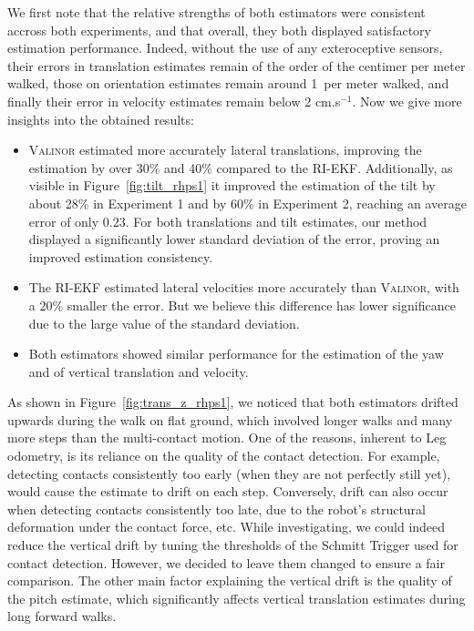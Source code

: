 \documentclass{IJCAS}
\begin{document}
We first note that the relative strengths of both estimators were consistent accross both experiments, and that overall, they both displayed satisfactory estimation performance. Indeed, without the use of any exteroceptive sensors, their errors in translation estimates remain of the order of the centimer per meter walked, those on orientation estimates remain around 1\textdegree \ per meter walked, and finally their error in velocity estimates remain below 2 cm.s$^{-1}$. Now we give more insights into the obtained results:
\begin{itemize}
    \item {\scshape Valinor} estimated more accurately lateral translations, improving the estimation by over 30\% and 40\% compared to the RI-EKF. Additionally, as visible in Figure~\ref{fig:tilt_rhps1} it improved the estimation of the tilt by about 28\% in Experiment 1 and by 60\% in Experiment 2, reaching an average error of only 0.23\textdegree. For both translations and tilt estimates, our method displayed a significantly lower standard deviation of the error, proving an improved estimation consistency. 
    \item The RI-EKF estimated lateral velocities more accurately than {\scshape Valinor}, with a 20\% smaller the error. But we believe this difference has lower significance due to the large value of the standard deviation.
    \item Both estimators showed similar performance for the estimation of the yaw and of vertical translation and velocity.
\end{itemize}

As shown in Figure~\ref{fig:trans_z_rhps1}, we noticed that both estimators drifted upwards during the walk on flat ground, which involved longer walks and many more steps than the multi-contact motion. One of the reasons, inherent to Leg odometry, is its reliance on the quality of the contact detection. For example, detecting contacts consistently too early (when they are not perfectly still yet), would cause the estimate to drift on each step. Conversely, drift can also occur when detecting contacts consistently too late, due to the robot's structural deformation under the contact force, etc. While investigating, we could indeed reduce the vertical drift by tuning the thresholds of the Schmitt Trigger used for contact detection. However, we decided to leave them changed to ensure a fair comparison. The other main factor explaining the vertical drift is the quality of the pitch estimate, which significantly affects vertical translation estimates during long forward walks.
\end{document}
